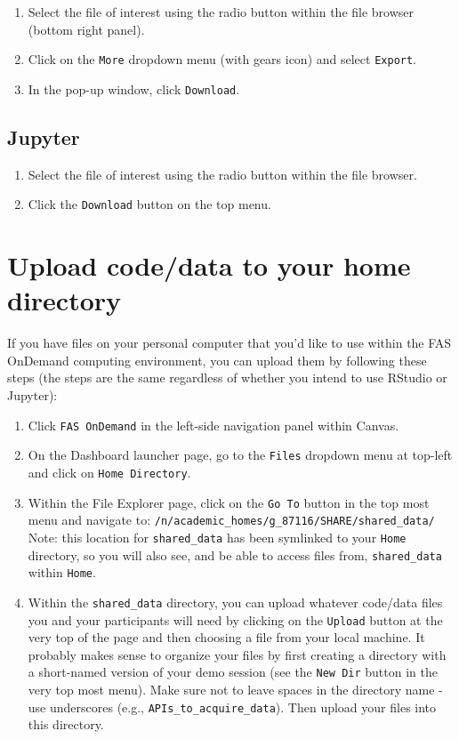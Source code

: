 \documentclass[]{book}
\providecommand{\tightlist}{%
  \setlength{\itemsep}{0pt}\setlength{\parskip}{0pt}}
\begin{document}
\begin{enumerate}
\def\labelenumi{\arabic{enumi}.}
\tightlist
\item
  Select the file of interest using the radio button within the file browser (bottom right panel).
\item
  Click on the \texttt{More} dropdown menu (with gears icon) and select \texttt{Export}.
\item
  In the pop-up window, click \texttt{Download}.
\end{enumerate}

\hypertarget{jupyter-2}{%
\section{Jupyter}\label{jupyter-2}}

\begin{enumerate}
\def\labelenumi{\arabic{enumi}.}
\tightlist
\item
  Select the file of interest using the radio button within the file browser.
\item
  Click the \texttt{Download} button on the top menu.
\end{enumerate}

\hypertarget{upload-codedata-to-your-home-directory}{%
\chapter{Upload code/data to your home directory}\label{upload-codedata-to-your-home-directory}}

If you have files on your personal computer that you'd like to use within the FAS OnDemand computing environment, you can upload them by following these steps (the steps are the same regardless of whether you intend to use RStudio or Jupyter):

\begin{enumerate}
\def\labelenumi{\arabic{enumi}.}
\tightlist
\item
  Click \texttt{FAS\ OnDemand} in the left-side navigation panel within Canvas.
\item
  On the Dashboard launcher page, go to the \texttt{Files} dropdown menu at top-left and click on \texttt{Home\ Directory}.
\item
  Within the File Explorer page, click on the \texttt{Go\ To} button in the top most menu and navigate to: \texttt{/n/academic\_homes/g\_87116/SHARE/shared\_data/} Note: this location for \texttt{shared\_data} has been symlinked to your \texttt{Home} directory, so you will also see, and be able to access files from, \texttt{shared\_data} within \texttt{Home}.
\item
  Within the \texttt{shared\_data} directory, you can upload whatever code/data files you and your participants will need by clicking on the \texttt{Upload} button at the very top of the page and then choosing a file from your local machine. It probably makes sense to organize your files by first creating a directory with a short-named version of your demo session (see the \texttt{New\ Dir} button in the very top most menu). Make sure not to leave spaces in the directory name - use underscores (e.g., \texttt{APIs\_to\_acquire\_data}). Then upload your files into this directory.
\end{enumerate}
\end{document}
